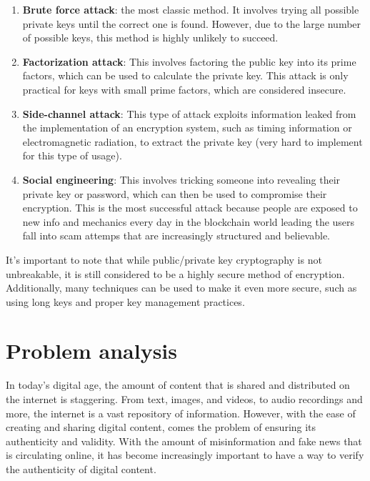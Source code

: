 \documentclass[target=mst,aauheader=]{thud}
\begin{document}
    \begin{enumerate}

        \item \textbf{Brute force attack}: the most classic method. It involves trying all possible private keys until the correct one is found. However, due to the large number of possible keys, this method is highly unlikely to succeed.
        \item \textbf{Factorization attack}: This involves factoring the public key into its prime factors, which can be used to calculate the private key. This attack is only practical for keys with small prime factors, which are considered insecure.
        \item \textbf{Side-channel attack}: This type of attack exploits information leaked from the implementation of an encryption system, such as timing information or electromagnetic radiation, to extract the private key (very hard to implement for this type of usage).
        \item \textbf{Social engineering}: This involves tricking someone into revealing their private key or password, which can then be used to compromise their encryption. This is the most successful attack because people are exposed to new info and mechanics every day in the blockchain world leading the users fall into scam attemps that are increasingly structured and believable.

    \end{enumerate}

    It's important to note that while public/private key cryptography is not unbreakable, it is still considered to be a highly secure method of encryption. Additionally, many techniques can be used to make it even more secure, such as using long keys and proper key management practices.








\chapter{Problem analysis}

In today's digital age, the amount of content that is shared and distributed on the internet is staggering. From text, images, and videos, to audio recordings and more, the internet is a vast repository of information. However, with the ease of creating and sharing digital content, comes the problem of ensuring its authenticity and validity. With the amount of misinformation and fake news that is circulating online, it has become increasingly important to have a way to verify the authenticity of digital content.\\
\end{document}
